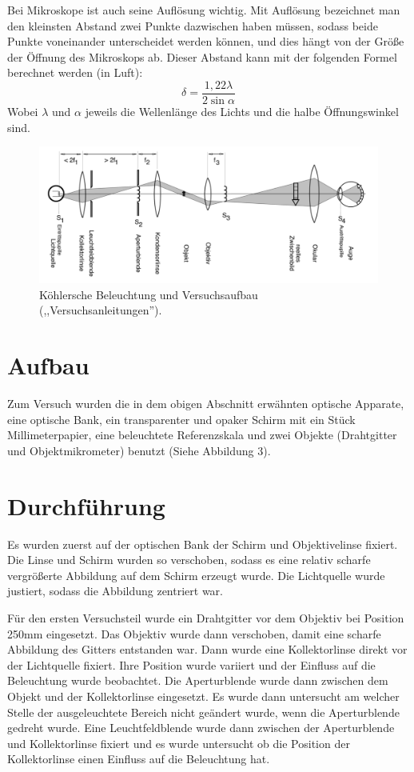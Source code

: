 \documentclass[11pt,a4paper]{article}
\begin{document}
Bei Mikroskope ist auch seine Auflösung wichtig. Mit Auflösung bezeichnet man den kleinsten Abstand zwei Punkte dazwischen haben müssen, sodass beide Punkte voneinander unterscheidet werden können, und dies hängt von der Größe der Öffnung des Mikroskops ab. Dieser Abstand kann mit der folgenden Formel berechnet werden (in Luft):
\begin{equation}
\delta = \frac{1,22\lambda}{2 \sin \alpha}
\end{equation}
Wobei $\lambda$ und $\alpha$ jeweils die Wellenlänge des Lichts und die halbe Öffnungswinkel sind. 

\begin{figure}
	\centering
	\includegraphics[width=\linewidth]{Abb3}
	\caption{Köhlersche Beleuchtung und Versuchsaufbau (,,Versuchsanleitungen'').}
\end{figure}

\section{Aufbau}
Zum Versuch wurden die in dem obigen Abschnitt erwähnten optische Apparate, eine optische Bank, ein transparenter und opaker Schirm mit ein Stück Millimeterpapier, eine beleuchtete Referenzskala und zwei Objekte (Drahtgitter und Objektmikrometer) benutzt (Siehe Abbildung 3). 

\section{Durchführung}
Es wurden zuerst auf der optischen Bank der Schirm und Objektivelinse fixiert. Die Linse und Schirm wurden so verschoben, sodass es eine relativ scharfe vergrößerte Abbildung auf dem Schirm erzeugt wurde. Die Lichtquelle wurde justiert, sodass die Abbildung zentriert war.  

Für den ersten Versuchsteil wurde ein Drahtgitter vor dem Objektiv bei Position 250mm eingesetzt. Das Objektiv wurde dann verschoben, damit eine scharfe Abbildung des Gitters entstanden war. Dann wurde eine Kollektorlinse direkt vor der Lichtquelle fixiert. Ihre Position wurde variiert und der Einfluss auf die Beleuchtung wurde beobachtet. Die Aperturblende wurde dann zwischen dem Objekt und der Kollektorlinse eingesetzt. Es wurde dann untersucht am welcher Stelle der ausgeleuchtete Bereich nicht geändert wurde, wenn die Aperturblende gedreht wurde. Eine Leuchtfeldblende wurde dann zwischen der Aperturblende und Kollektorlinse fixiert und es wurde untersucht ob die Position der Kollektorlinse einen Einfluss auf die Beleuchtung hat. 
\end{document}
